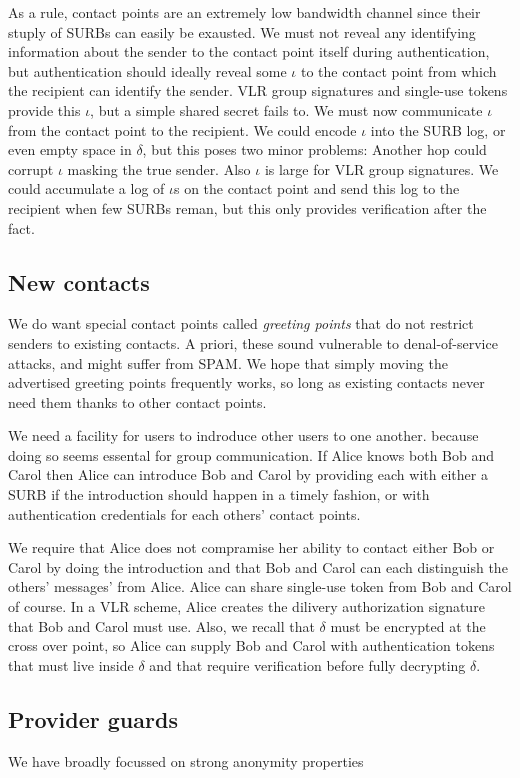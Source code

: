 As a rule, contact points are an extremely low bandwidth channel
since their stuply of SURBs can easily be exausted.  We must not
reveal any identifying information about the sender to the contact 
point itself during authentication, but authentication should ideally
reveal some $\iota$ to the contact point from which the recipient
can identify the sender.  VLR group signatures and single-use tokens
provide this $\iota$, but a simple shared secret fails to.  We must
now communicate $\iota$ from the contact point to the recipient. 
We could encode $\iota$ into the SURB log, or even empty space in
$\delta$, but this poses two minor problems: 
 Another hop could corrupt $\iota$ masking the true sender.
 Also $\iota$ is large for VLR group signatures.  
We could accumulate a log of $\iota$s on the contact point and send
this log to the recipient when few SURBs reman, but this only
provides verification after the fact.



\subsection{New contacts}

We do want special contact points called {\em greeting points} that
do not restrict senders to existing contacts.  A priori, these sound
vulnerable to denal-of-service attacks, and might suffer from SPAM.
We hope that simply moving the advertised greeting points frequently
works, so long as existing contacts never need them thanks to other
contact points.

We need a facility for users to indroduce other users to one another.
because doing so seems essental for group communication.  If Alice 
knows both Bob and Carol then Alice can introduce Bob and Carol by
providing each with either a SURB if the introduction should happen
in a timely fashion, or with authentication credentials for each
others' contact points.  

We require that Alice does not compramise her ability to contact
either Bob or Carol by doing the introduction and that Bob and Carol
can each distinguish the others' messages' from Alice. 
Alice can share single-use token from Bob and Carol of course.
In a VLR scheme, Alice creates the dilivery authorization signature
that Bob and Carol must use.
Also, we recall that $\delta$ must be encrypted at the cross over
point, so Alice can supply Bob and Carol with authentication tokens 
that must live inside $\delta$ and that require verification before
fully decrypting $\delta$.  



\subsection{Provider guards}

We have broadly focussed on strong anonymity properties 




